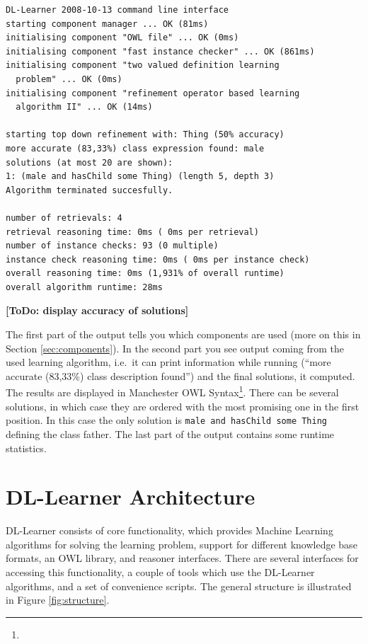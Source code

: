 \documentclass[a4paper,12pt]{scrartcl}
\newcommand{\todo}[1]{\textbf{[ToDo: #1]}}
\begin{document}
\begin{verbatim}
DL-Learner 2008-10-13 command line interface
starting component manager ... OK (81ms)
initialising component "OWL file" ... OK (0ms)
initialising component "fast instance checker" ... OK (861ms)
initialising component "two valued definition learning 
  problem" ... OK (0ms)
initialising component "refinement operator based learning 
  algorithm II" ... OK (14ms)

starting top down refinement with: Thing (50% accuracy)
more accurate (83,33%) class expression found: male
solutions (at most 20 are shown):
1: (male and hasChild some Thing) (length 5, depth 3)
Algorithm terminated succesfully.

number of retrievals: 4
retrieval reasoning time: 0ms ( 0ms per retrieval)
number of instance checks: 93 (0 multiple)
instance check reasoning time: 0ms ( 0ms per instance check)
overall reasoning time: 0ms (1,931% of overall runtime)
overall algorithm runtime: 28ms
\end{verbatim}

\todo{display accuracy of solutions}

The first part of the output tells you which components are used (more on this in Section \ref{sec:components}). In the second part you see output coming from the used learning algorithm, i.e.~it can print information while running (``more accurate (83,33\%) class description found'') and the final solutions, it computed. The results are displayed in Manchester OWL Syntax\footnote{\mos}. There can be several solutions, in which case they are ordered with the most promising one in the first position. In this case the only solution is \verb|male and hasChild some Thing| defining the class father. The last part of the output contains some runtime statistics.

\section{DL-Learner Architecture}

DL-Learner consists of core functionality, which provides Machine Learning algorithms for solving the learning problem, support for different knowledge base formats, an OWL library, and reasoner interfaces. There are several interfaces for accessing this functionality, a couple of tools which use the DL-Learner algorithms, and a set of convenience scripts. The general structure is illustrated in Figure \ref{fig:structure}.
\end{document}

